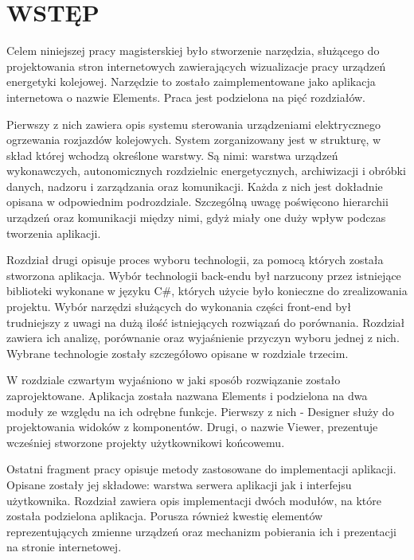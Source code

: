 \chapter*{WSTĘP}

Celem niniejszej pracy magisterskiej było stworzenie narzędzia, służącego do projektowania stron internetowych zawierających wizualizacje pracy urządzeń energetyki kolejowej. Narzędzie to zostało zaimplementowane jako aplikacja internetowa o nazwie Elements. Praca jest podzielona na pięć rozdziałów.

Pierwszy z nich zawiera opis systemu sterowania urządzeniami elektrycznego ogrzewania rozjazdów kolejowych. System zorganizowany jest w strukturę, w skład której wchodzą określone warstwy. Są nimi: warstwa urządzeń wykonawczych, autonomicznych rozdzielnic energetycznych, archiwizacji i obróbki danych, nadzoru i zarządzania oraz komunikacji. Każda z nich jest dokładnie opisana w odpowiednim podrozdziale. Szczególną uwagę poświęcono hierarchii urządzeń oraz komunikacji między nimi, gdyż miały one duży wpływ podczas tworzenia aplikacji.

Rozdział drugi opisuje proces wyboru technologii, za pomocą których została stworzona aplikacja. Wybór technologii back-endu był narzucony przez istniejące biblioteki wykonane w języku C\#, których użycie było konieczne do zrealizowania projektu. Wybór narzędzi służących do wykonania części front-end był trudniejszy z uwagi na dużą ilość istniejących rozwiązań do porównania. Rozdział zawiera ich analizę, porównanie oraz wyjaśnienie przyczyn wyboru jednej z nich. Wybrane technologie zostały szczegółowo opisane w rozdziale trzecim.

W rozdziale czwartym wyjaśniono w jaki sposób rozwiązanie zostało zaprojektowane. Aplikacja została nazwana Elements i podzielona na dwa moduły ze względu na ich odrębne funkcje. Pierwszy z nich - Designer służy do projektowania widoków z komponentów. Drugi, o nazwie Viewer, prezentuje wcześniej stworzone projekty użytkownikowi końcowemu.

Ostatni fragment pracy opisuje metody zastosowane do implementacji aplikacji. Opisane zostały jej składowe: warstwa serwera aplikacji jak i interfejsu użytkownika. Rozdział zawiera opis implementacji dwóch modułów, na które została podzielona aplikacja. Porusza również kwestię elementów reprezentujących zmienne urządzeń oraz mechanizm pobierania ich i prezentacji na stronie internetowej.

